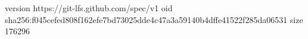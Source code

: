 version https://git-lfs.github.com/spec/v1
oid sha256:f045cefed808f162efe7bd73025dde4c47a3a59140b4dffe41522f285da06531
size 176296
